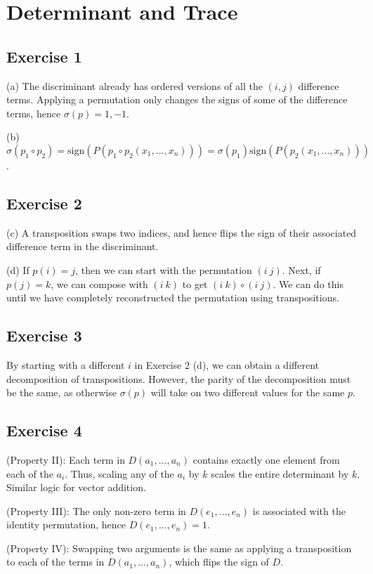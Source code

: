 \section{Determinant and Trace}

\subsection{Exercise 1}
(a) The discriminant already has ordered versions of all the $(i, j)$ difference terms.
Applying a permutation only changes the signs of some of the difference terms, hence
$\sigma(p) = 1, -1$.

(b) $\sigma(p_1 \circ p_2) = \text{sign}(P(p_1 \circ p_2 (x_1, ..., x_n)))  = \sigma(p_1) \text{sign}(P(p_2 (x_1, ..., x_n)))$.

\subsection{Exercise 2}
(c) A transposition swaps two indices, and hence flips the sign of their associated
difference term in the discriminant.

(d) If $p(i) = j$, then we can start with the permutation $(i \: j)$.
Next, if $p(j) = k$, we can compose with  $(i \: k)$ to get $(i \: k) \circ (i \: j)$.
We can do this until we have completely reconstructed the permutation using
transpositions.

\subsection{Exercise 3}
By starting with a different $i$ in Exercise 2 (d), we can obtain a different
decomposition of transpositions. However, the parity of the decomposition must
be the same, as otherwise $\sigma(p)$ will take on two different values for
the same $p$.

\subsection{Exercise 4}
(Property II): Each term in $D(a_1, ..., a_n)$ contains exactly one element
from each of the $a_i$. Thus, scaling any of the $a_i$ by $k$ scales the entire
determinant by $k$. Similar logic for vector addition.

(Property III): The only non-zero term in $D(e_1, ..., e_n)$ is associated with
the identity permutation, hence $D(e_1, ..., e_n) = 1$.

(Property IV): Swapping two arguments is the same as applying a transposition to
each of the terms in $D(a_1, ..., a_n)$, which flips the sign of $D$.


